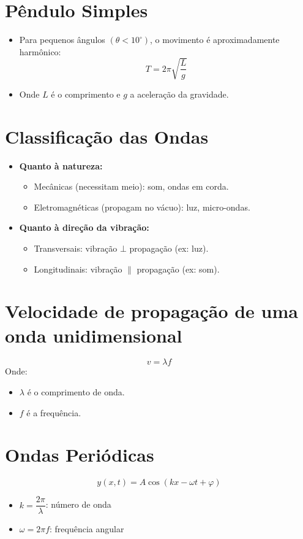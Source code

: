 \documentclass[a4paper,12pt]{article}
\begin{document}
\begin{multicols}{2}
\section{Pêndulo Simples}
\begin{itemize}
    \item Para pequenos ângulos $(\theta < 10^\circ)$, o movimento é aproximadamente harmônico:
    \[
        T = 2\pi \sqrt{\frac{L}{g}}
    \]
    \item Onde $L$ é o comprimento e $g$ a aceleração da gravidade.
\end{itemize}

\section{Classificação das Ondas}
\begin{itemize}
    \item \textbf{Quanto à natureza:}
    \begin{itemize}
        \item Mecânicas (necessitam meio): som, ondas em corda.
        \item Eletromagnéticas (propagam no vácuo): luz, micro-ondas.
    \end{itemize}
    \item \textbf{Quanto à direção da vibração:}
    \begin{itemize}
        \item Transversais: vibração $\bot$ propagação (ex: luz).
        \item Longitudinais: vibração $\|$ propagação (ex: som).
    \end{itemize}
\end{itemize}

\section{Velocidade de propagação de uma onda unidimensional}
\[
    v = \lambda f
\]
Onde:
\begin{itemize}
    \item $\lambda$ é o comprimento de onda.
    \item $f$ é a frequência.
\end{itemize}

\section{Ondas Periódicas}
\[
    y(x, t) = A \cos(kx - \omega t + \varphi)
\]
\begin{itemize}
    \item $k = \dfrac{2\pi}{\lambda}$: número de onda
    \item $\omega = 2\pi f $: frequência angular
\end{itemize}


\end{multicols}
\end{document}
